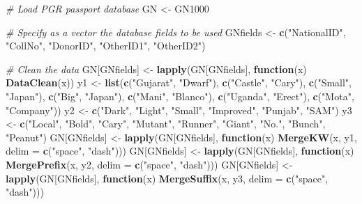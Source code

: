 \documentclass[]{article}
\newenvironment{Shaded}{\begin{snugshade}}{\end{snugshade}}
\newcommand{\CommentTok}[1]{\textcolor[rgb]{0.56,0.35,0.01}{\textit{#1}}}
\newcommand{\ControlFlowTok}[1]{\textcolor[rgb]{0.13,0.29,0.53}{\textbf{#1}}}
\newcommand{\DataTypeTok}[1]{\textcolor[rgb]{0.13,0.29,0.53}{#1}}
\newcommand{\KeywordTok}[1]{\textcolor[rgb]{0.13,0.29,0.53}{\textbf{#1}}}
\newcommand{\NormalTok}[1]{#1}
\newcommand{\StringTok}[1]{\textcolor[rgb]{0.31,0.60,0.02}{#1}}
\begin{document}
\begin{Shaded}
\begin{Highlighting}[]
\CommentTok{# Load PGR passport database}
\NormalTok{GN <-}\StringTok{ }\NormalTok{GN1000}

\CommentTok{# Specify as a vector the database fields to be used}
\NormalTok{GNfields <-}\StringTok{ }\KeywordTok{c}\NormalTok{(}\StringTok{"NationalID"}\NormalTok{, }\StringTok{"CollNo"}\NormalTok{, }\StringTok{"DonorID"}\NormalTok{, }\StringTok{"OtherID1"}\NormalTok{, }\StringTok{"OtherID2"}\NormalTok{)}

\CommentTok{# Clean the data}
\NormalTok{GN[GNfields] <-}\StringTok{ }\KeywordTok{lapply}\NormalTok{(GN[GNfields], }\ControlFlowTok{function}\NormalTok{(x) }\KeywordTok{DataClean}\NormalTok{(x))}
\NormalTok{y1 <-}\StringTok{ }\KeywordTok{list}\NormalTok{(}\KeywordTok{c}\NormalTok{(}\StringTok{"Gujarat"}\NormalTok{, }\StringTok{"Dwarf"}\NormalTok{), }\KeywordTok{c}\NormalTok{(}\StringTok{"Castle"}\NormalTok{, }\StringTok{"Cary"}\NormalTok{), }\KeywordTok{c}\NormalTok{(}\StringTok{"Small"}\NormalTok{, }\StringTok{"Japan"}\NormalTok{),}
\KeywordTok{c}\NormalTok{(}\StringTok{"Big"}\NormalTok{, }\StringTok{"Japan"}\NormalTok{), }\KeywordTok{c}\NormalTok{(}\StringTok{"Mani"}\NormalTok{, }\StringTok{"Blanco"}\NormalTok{), }\KeywordTok{c}\NormalTok{(}\StringTok{"Uganda"}\NormalTok{, }\StringTok{"Erect"}\NormalTok{),}
\KeywordTok{c}\NormalTok{(}\StringTok{"Mota"}\NormalTok{, }\StringTok{"Company"}\NormalTok{))}
\NormalTok{y2 <-}\StringTok{ }\KeywordTok{c}\NormalTok{(}\StringTok{"Dark"}\NormalTok{, }\StringTok{"Light"}\NormalTok{, }\StringTok{"Small"}\NormalTok{, }\StringTok{"Improved"}\NormalTok{, }\StringTok{"Punjab"}\NormalTok{, }\StringTok{"SAM"}\NormalTok{)}
\NormalTok{y3 <-}\StringTok{ }\KeywordTok{c}\NormalTok{(}\StringTok{"Local"}\NormalTok{, }\StringTok{"Bold"}\NormalTok{, }\StringTok{"Cary"}\NormalTok{, }\StringTok{"Mutant"}\NormalTok{, }\StringTok{"Runner"}\NormalTok{, }\StringTok{"Giant"}\NormalTok{, }\StringTok{"No."}\NormalTok{,}
        \StringTok{"Bunch"}\NormalTok{, }\StringTok{"Peanut"}\NormalTok{)}
\NormalTok{GN[GNfields] <-}\StringTok{ }\KeywordTok{lapply}\NormalTok{(GN[GNfields],}
                       \ControlFlowTok{function}\NormalTok{(x) }\KeywordTok{MergeKW}\NormalTok{(x, y1, }\DataTypeTok{delim =} \KeywordTok{c}\NormalTok{(}\StringTok{"space"}\NormalTok{, }\StringTok{"dash"}\NormalTok{)))}
\NormalTok{GN[GNfields] <-}\StringTok{ }\KeywordTok{lapply}\NormalTok{(GN[GNfields],}
                       \ControlFlowTok{function}\NormalTok{(x) }\KeywordTok{MergePrefix}\NormalTok{(x, y2, }\DataTypeTok{delim =} \KeywordTok{c}\NormalTok{(}\StringTok{"space"}\NormalTok{, }\StringTok{"dash"}\NormalTok{)))}
\NormalTok{GN[GNfields] <-}\StringTok{ }\KeywordTok{lapply}\NormalTok{(GN[GNfields],}
                       \ControlFlowTok{function}\NormalTok{(x) }\KeywordTok{MergeSuffix}\NormalTok{(x, y3, }\DataTypeTok{delim =} \KeywordTok{c}\NormalTok{(}\StringTok{"space"}\NormalTok{, }\StringTok{"dash"}\NormalTok{)))}


\end{Highlighting}
\end{Shaded}
\end{document}
